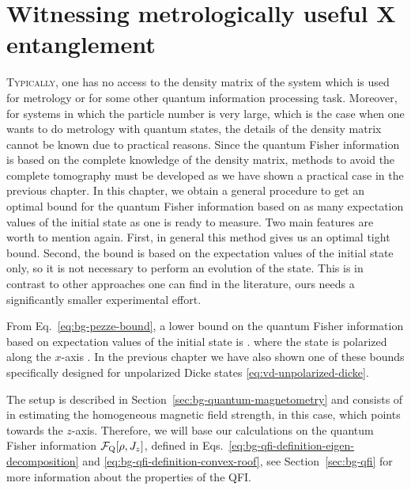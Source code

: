 \section[Witnessing metrologically useful entanglement]
{Witnessing metrologically useful {\color{grey} X} entanglement}
\label{sec:lt}



\lettrine[lines=2, findent=3pt,nindent=0pt]{T}{ypically}, one has no access to the density matrix of the system which is used for metrology or for some other quantum information processing task.
Moreover, for systems in which the particle number is very large, which is the case when one wants to do metrology with quantum states, the details of the density matrix cannot be known due to practical reasons.
Since the quantum Fisher information is based on the complete knowledge of the density matrix, methods to avoid the complete tomography must be developed as we have shown a practical case in the previous chapter.
In this chapter, we obtain a general procedure to get an optimal bound for the quantum Fisher information based on as many expectation values of the initial state as one is ready to measure.
Two main features are worth to mention again.
First, in general this method gives us an optimal tight bound.
Second, the bound is based on the expectation values of the initial state only, so it is not necessary to perform an evolution of the state.
This is in contrast to other approaches one can find in the literature, ours needs a significantly smaller experimental effort.

From Eq.~\eqref{eq:bg-pezze-bound}, a lower bound on the quantum Fisher information based on expectation values of the initial state is
\be
   \geqslant {}.
\ee
where the state is polarized along the $x$-axis \cite{Pezze2009}.
In the previous chapter we have also shown one of these bounds specifically designed for unpolarized Dicke states \eqref{eq:vd-unpolarized-dicke}.

The setup is described in Section~\ref{sec:bg-quantum-magnetometry} and consists of in estimating the homogeneous magnetic field strength, in this case, which points towards the $z$-axis.
Therefore, we will base our calculations on the quantum Fisher information $\mathcal{F}_{\textnormal{Q}}[{\textstyle \rho, J_z}]$, defined in Eqs.~\eqref{eq:bg-qfi-definition-eigen-decomposition} and \eqref{eq:bg-qfi-definition-convex-roof}, see Section~\ref{sec:bg-qfi} for more information about the properties of the QFI.

